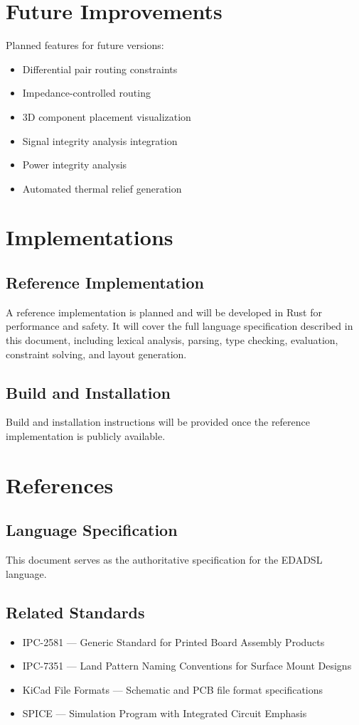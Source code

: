 \chapter{Future Improvements}
Planned features for future versions:
\begin{itemize}
\item Differential pair routing constraints
\item Impedance-controlled routing
\item 3D component placement visualization
\item Signal integrity analysis integration
\item Power integrity analysis
\item Automated thermal relief generation
\end{itemize}


\chapter{Implementations}

\section{Reference Implementation}
A reference implementation is planned and will be developed in Rust for performance and safety. It will cover the full language specification described in this document, including lexical analysis, parsing, type checking, evaluation, constraint solving, and layout generation.

\section{Build and Installation}
Build and installation instructions will be provided once the reference implementation is publicly available.


\chapter{References}

\section{Language Specification}
This document serves as the authoritative specification for the EDADSL language.

\section{Related Standards}
\begin{itemize}
\item IPC-2581 — Generic Standard for Printed Board Assembly Products
\item IPC-7351 — Land Pattern Naming Conventions for Surface Mount Designs
\item KiCad File Formats — Schematic and PCB file format specifications
\item SPICE — Simulation Program with Integrated Circuit Emphasis
\end{itemize}




